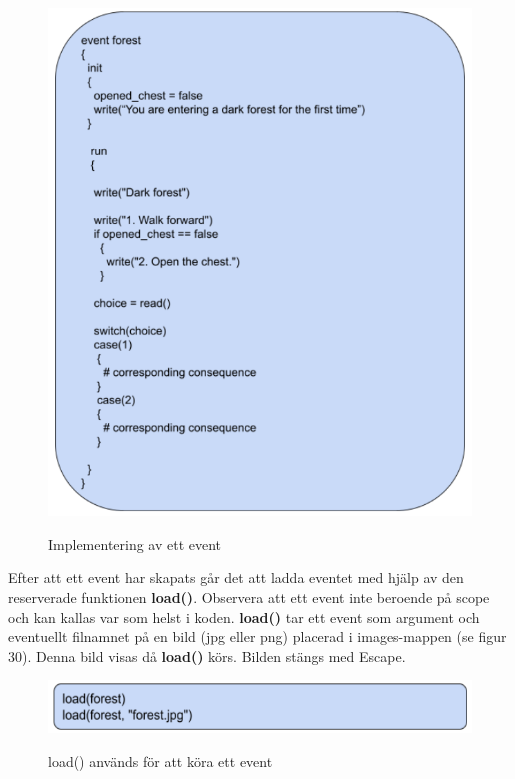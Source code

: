 \documentclass{Dokumentmall}
\begin{document}
\begin{figure}[h!]
  \centering
  \includegraphics[scale = 0.65]{Images/Figur29.png}
  \label{}
  \caption{Implementering av ett event}
\end{figure}

\newpage
Efter att ett event har skapats går det att ladda eventet med hjälp av den reserverade funktionen \textbf{load()}.
Observera att ett event inte beroende på scope och kan kallas var som helst i koden.  \textbf{load()} tar ett event som argument och eventuellt filnamnet på en bild (jpg eller png) placerad i images-mappen  (se figur 30). Denna bild visas då  \textbf{load()} körs. Bilden stängs med Escape.

\begin{figure}[h!]
  \centering
  \includegraphics[scale = 0.65]{Images/Figur30.png}
  \label{}
  \caption{load() används för att köra ett event}
\end{figure}
\end{document}
